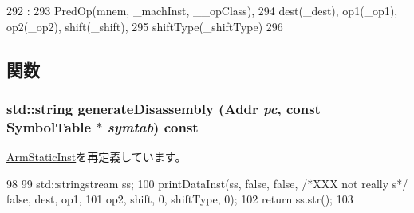 \begin{DoxyCode}
292                                                               :
293         PredOp(mnem, _machInst, __opClass),
294         dest(_dest), op1(_op1), op2(_op2), shift(_shift),
295         shiftType(_shiftType)
296     {}

\end{DoxyCode}


\subsection{関数}
\hypertarget{classArmISA_1_1DataRegRegOp_a95d323a22a5f07e14d6b4c9385a91896}{
\subsubsection[{generateDisassembly}]{\setlength{\rightskip}{0pt plus 5cm}std::string generateDisassembly ({\bf Addr} {\em pc}, \/  const SymbolTable $\ast$ {\em symtab}) const}}
\label{classArmISA_1_1DataRegRegOp_a95d323a22a5f07e14d6b4c9385a91896}


\hyperlink{classArmISA_1_1ArmStaticInst_a95d323a22a5f07e14d6b4c9385a91896}{ArmStaticInst}を再定義しています。


\begin{DoxyCode}
98 {
99     std::stringstream ss;
100     printDataInst(ss, false, false, /*XXX not really s*/ false, dest, op1,
101                   op2, shift, 0, shiftType, 0);
102     return ss.str();
103 }
\end{DoxyCode}


